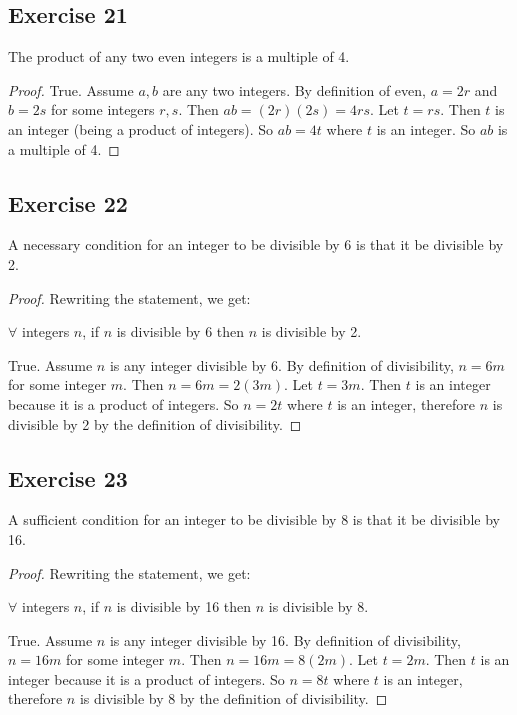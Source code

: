 \documentclass[14pt]{extarticle}
\newcommand{\fa}{\forall}
\begin{document}
\subsection{Exercise 21}
The product of any two even integers is a multiple of 4.

\begin{proof}
True. Assume $a,b$ are any two integers. By definition of even, $a = 2r$ and $b = 2s$ for some integers $r,s$. Then $ab = (2r)(2s) = 4rs$. Let $t = rs$. Then $t$ is an integer (being a product of integers). So $ab = 4t$ where $t$ is an integer. So $ab$ is a multiple of 4.
\end{proof}

\subsection{Exercise 22}
A necessary condition for an integer to be divisible by 6 is that it be divisible by 2.

\begin{proof}
Rewriting the statement, we get:

$\fa$ integers $n$, if $n$ is divisible by 6 then $n$ is divisible by 2.

True. Assume $n$ is any integer divisible by 6. By definition of divisibility, $n = 6m$ for some integer $m$. Then $n = 6m = 2(3m)$. Let $t = 3m$. Then $t$ is an integer because it is a product of integers. So $n = 2t$ where $t$ is an integer, therefore $n$ is divisible by 2 by the definition of divisibility.
\end{proof}

\subsection{Exercise 23}
A sufficient condition for an integer to be divisible by 8 is that it be divisible by 16.

\begin{proof}
Rewriting the statement, we get:

$\fa$ integers $n$, if $n$ is divisible by 16 then $n$ is divisible by 8.

True. Assume $n$ is any integer divisible by 16. By definition of divisibility, $n = 16m$ for some integer $m$. Then $n = 16m = 8(2m)$. Let $t = 2m$. Then $t$ is an integer because it is a product of integers. So $n = 8t$ where $t$ is an integer, therefore $n$ is divisible by 8 by the definition of divisibility.
\end{proof}
\end{document}
